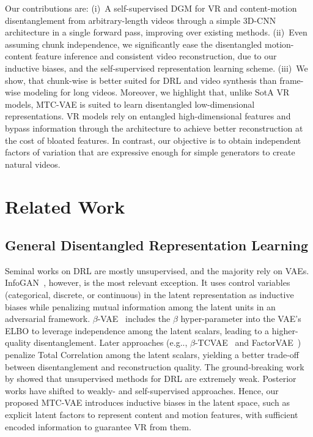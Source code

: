 \documentclass[journal]{IEEEtran}
\makeatletter
\DeclareRobustCommand\onedot{\futurelet\@let@token\@onedot}
\def\@onedot{\ifx\@let@token.\else.\null\fi\xspace}
\def\eg{{e.g}\onedot} \def\Eg{{E.g}\onedot}
\makeatother
\begin{document}
Our contributions are: (i)~A self-supervised DGM for VR and content-motion disentanglement from arbitrary-length videos through a simple 3D-CNN architecture in a single forward pass, improving over existing methods.
(ii)~Even assuming chunk independence, we significantly ease the disentangled motion-content feature inference and consistent video reconstruction, due to our inductive biases, and the self-supervised representation learning scheme.
(iii)~We show, that chunk-wise is better suited for DRL and video synthesis than frame-wise modeling for long videos.
Moreover, we highlight that, unlike SotA VR models, MTC-VAE is suited to learn disentangled low-dimensional representations.
VR models rely on entangled high-dimensional features and bypass information through the architecture to achieve better reconstruction at the cost of bloated features.
In contrast, our objective is to obtain independent factors of variation that are expressive enough for simple generators to create natural videos.

\section{Related Work}
\label{sec:soa}

\subsection{General Disentangled Representation Learning}
Seminal works on DRL are mostly unsupervised, and the majority rely on VAEs.
InfoGAN~\cite{Chen2016}, however, is the most relevant exception.
It uses control variables (categorical, discrete, or continuous) in the latent representation as inductive biases while penalizing mutual information among the latent units in an adversarial framework.
$\beta$-VAE~\cite{Higgins2017} includes the $\beta$ hyper-parameter into the VAE's ELBO to leverage independence among the latent scalars, leading to a higher-quality disentanglement.
Later approaches (\eg, $\beta$-TCVAE~\cite{Chen2018dr} and FactorVAE~\cite{Kim2018}) penalize Total Correlation among the latent scalars, yielding a better trade-off between disentanglement and reconstruction quality.
The ground-breaking work by \textcite{Locatello2019} showed that unsupervised methods for DRL are extremely weak.
Posterior works have shifted to weakly- and self-supervised approaches.
Hence, our proposed MTC-VAE introduces inductive biases in the latent space, such as explicit latent factors to represent content and motion features, with sufficient encoded information to guarantee VR from them.
\end{document}
